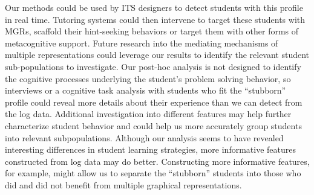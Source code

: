 \documentclass{edm_template}
\begin{document}
Our methods could be used by ITS designers to detect students with this profile in real time. Tutoring systems could then intervene to target these students with MGRs, scaffold their hint-seeking behaviors or target them with other forms of metacognitive support. Future research into  the mediating mechanisms of multiple representations could leverage our results to identify the relevant student sub-populations to investigate. Our post-hoc analysis is not designed to identify the cognitive processes underlying the student's problem solving behavior, so interviews or a cognitive task analysis with students who fit the ``stubborn'' profile could reveal more details about their experience than we can detect from the log data. Additional investigation into different features may help further characterize student behavior and could help us more accurately group students into relevant subpopulations. Although our analysis seems to have revealed interesting differences in student learning strategies, more informative features constructed from log data may do better. Constructing more informative features, for example, might allow us to separate the ``stubborn'' students into those who did and did not benefit from multiple graphical representations. 
\end{document}
